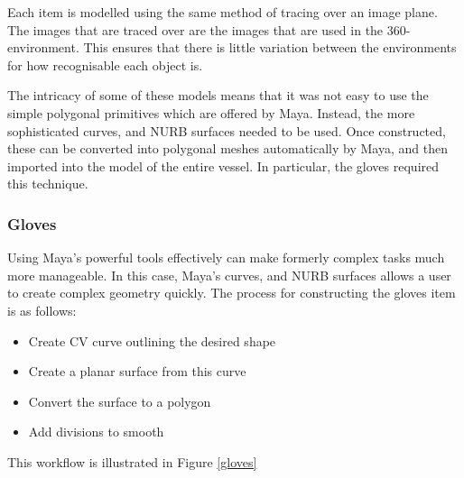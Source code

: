 \documentclass[ %
                    author={Elis Jones},
                supervisor={Dr. Kirsten Cater},
                    degree={BSc},
                     title={The Effect of Presentation Medium on Spatial Cognition},
                  subtitle={in the Virtual Environment},
                      year={2018} ]{dissertation}
\begin{document}
Each item is modelled using the same method of tracing over an image plane. The images that are traced over are the images that are used in the 360-environment. This ensures that there is little variation between the environments for how recognisable each object is. 

The intricacy of some of these models means that it was not easy to use the simple polygonal primitives which are offered by Maya. Instead, the more sophisticated curves, and NURB surfaces needed to be used. Once constructed, these can be converted into polygonal meshes automatically by Maya, and then imported into the model of the entire vessel. In particular, the gloves required this technique. 

\subsubsection{Gloves}
Using Maya's powerful tools effectively can make formerly complex tasks much more manageable. In this case, Maya's curves, and NURB surfaces allows a user to create complex geometry quickly. The process for constructing the gloves item is as follows: 

\begin{itemize}
    \item Create CV curve outlining the desired shape
    \item Create a planar surface from this curve
    \item Convert the surface to a polygon
    \item Add divisions to smooth
\end{itemize}

This workflow is illustrated in Figure \ref{gloves}
\end{document}
